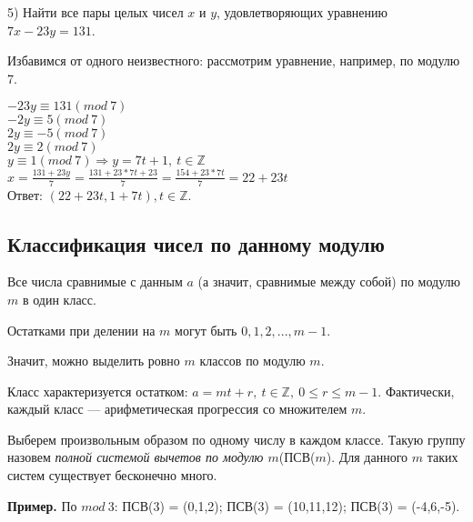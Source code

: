 \documentclass{article}
\begin{document}
    5) Найти все пары целых чисел \(x\) и \(y\), удовлетворяющих уравнению \(7x - 23y = 131\).

    Избавимся от одного неизвестного: рассмотрим уравнение, например, по модулю 7.

    \( -23y \equiv 131(mod\ 7) \)\\
    \( -2y \equiv 5(mod\ 7) \)\\
    \( 2y \equiv -5(mod\ 7) \)\\
    \( 2y \equiv 2(mod\ 7) \)\\
    \( y \equiv 1(mod\ 7) \Rightarrow y = 7t + 1,\ t \in \mathbb{Z} \)\\
    \( x = \frac{131 + 23y}{7} = \frac{131 + 23*7t + 23}{7} = \frac{154 + 23*7t}{7} = 22 + 23t \)\\
    Ответ: \( (22 + 23t, 1 + 7t), t \in \mathbb{Z} \).

    \subsection{Классификация чисел по данному модулю}
    
    Все числа сравнимые с данным \(a\) (а значит, сравнимые между собой) по модулю \(m\) в один класс.

    Остатками при делении на \(m\) могут быть \(0,1,2,...,m - 1\).

    Значит, можно выделить ровно \(m\) классов по модулю \(m\).

    Класс характеризуется остатком: \( a = mt + r,\ t \in \mathbb{Z},\ 0 \leq r \leq m - 1 \). Фактически, каждый класс --- арифметическая прогрессия со множителем \(m\).

    Выберем произвольным образом по одному числу в каждом классе. Такую группу назовем \textit{полной системой вычетов по модулю \(m\)}(ПСВ(\(m\)). Для данного \(m\) таких систем существует бесконечно много.

    \textbf{Пример.} По \(mod\ 3\): ПСВ(3) = (0,1,2); ПСВ(3) = (10,11,12); ПСВ(3) = (-4,6,-5).
    
\end{document}
